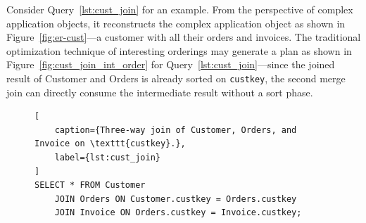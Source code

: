 \documentclass[sigconf, pdfa, nonacm]{acmart}
\newenvironment{queryblock}{
    \renewcommand{\lstlistingname}{Query} %
    \lstset{style=query}                   %
    \begin{figure}[htbp]           %
}{
    \end{figure}
}
\begin{document}
Consider Query~\ref{lst:cust_join} for an example. From the perspective of complex application objects, it reconstructs the complex application object as shown in Figure~\ref{fig:er-cust}---a customer with all their orders and invoices. 
The traditional optimization technique of interesting orderings may generate a plan as shown in Figure~\ref{fig:cust_join_int_order} for Query~\ref{lst:cust_join}---since the joined result of Customer and Orders is already sorted on \texttt{custkey}, the second merge join can directly consume the intermediate result without a sort phase.

\begin{queryblock}
\begin{lstlisting}[
    caption={Three-way join of Customer, Orders, and Invoice on \texttt{custkey}.}, 
    label={lst:cust_join}
]
SELECT * FROM Customer 
    JOIN Orders ON Customer.custkey = Orders.custkey
    JOIN Invoice ON Orders.custkey = Invoice.custkey;
\end{lstlisting}
\end{queryblock}
\end{document}
